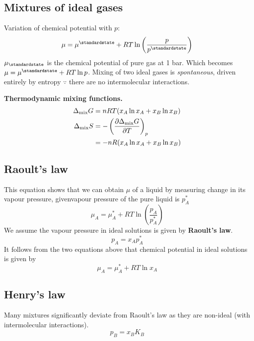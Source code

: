 \subsection*{Mixtures of ideal gases}
Variation of chemical potential with $p$:
\begin{equation*}
    \mu = \mu^\standardstate + RT \ln \left(\frac{p}{p^\standardstate}\right)
\end{equation*}
$\mu_\standardstate$ is the chemical potential of pure gas at 1 bar. Which becomes $ \mu = \mu^\standardstate + RT \ln p$. 
Mixing of two ideal gases is \textit{spontaneous}, driven entirely by entropy $\because$ there are no intermolecular interactions.
\vspace{\baselineskip}

\textbf{Thermodynamic mixing functions.}
\begin{equation*}
    \begin{aligned}
    \Delta_{\textrm{mix}}G &= nRT(x_A \ln x_A + x_B \ln x_B) \\
    \Delta_{\textrm{mix}}S &= - \left( \pdv{\Delta_{\textrm{mix}}G}{T}\right)_p \\
    &= -nR(x_A \ln x_A + x_B \ln x_B)
    \end{aligned}
\end{equation*}

\subsection*{Raoult's law}
This equation shows that we can obtain $\mu$ of a liquid by measuring
change in its vapour pressure, givenvapour pressure of the pure liquid is $p_A^*$
\begin{equation*}
    \mu_A = \mu_A^* + RT \ln \left(\frac{p_A}{p_A^*}\right)
\end{equation*}
We assume the vapour pressure in ideal solutions is given by \textbf{Raoult's law}.
\begin{equation*}
    p_A = x_A p_A^*
\end{equation*}
It follows from the two equations above that chemical potential in ideal solutions is given by
\begin{equation*}
    \mu_A = \mu_A^* + RT \ln x_A
\end{equation*}

\subsection*{Henry's law}
Many mixtures significantly deviate from Raoult's law as they are non-ideal (with intermolecular interactions).
\begin{equation*}
    p_B = x_B K_B
\end{equation*}

